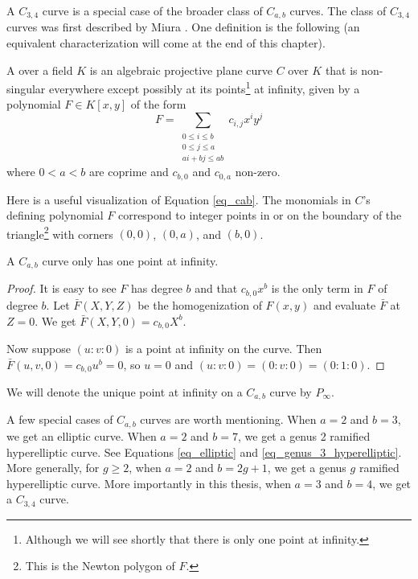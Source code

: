 A $C_{3,4}$ curve is a special case of the broader class of $C_{a,b}$ curves.
The class of $C_{3,4}$ curves was first described by Miura \cite{miura97}.
One definition is the following (an equivalent characterization will come at the end of this chapter).

\begin{definition}
  \label{def_cab_curve}
  A  over a field $K$
  is an algebraic projective plane curve $C$ over $K$
  that is non-singular everywhere except possibly at its points\footnote{
Although we will see shortly that there is only one point at infinity.}
  at infinity, given by a polynomial $F \in K[x,y]$ of the form
  \begin{equation}
    \label{eq_cab}
    F = \sum_{\substack{0 \leq i \leq b \\ 0 \leq j \leq a \\ ai + bj \leq ab }}c_{i,j}x^iy^j
  \end{equation}
  where $0 < a < b$ are coprime and $c_{b,0}$ and $c_{0,a}$ non-zero.
\end{definition}
Here is a useful visualization of Equation \ref{eq_cab}.
The monomials in $C$'s defining polynomial $F$ correspond to integer points
in or on the boundary of the triangle\footnote{
This is the Newton polygon of $F$.}
with corners $(0, 0)$, $(0, a)$, and $(b, 0)$.

\begin{proposition}
  A $C_{a,b}$ curve only has one point at infinity.
\end{proposition}
\begin{proof}
  It is easy to see $F$ has degree $b$
  and that $c_{b,0}x^b$ is the only term in $F$ of degree $b$.
  Let $\bar F(X,Y,Z)$ be the homogenization of $F(x,y)$ and evaluate $\bar F$ at $Z = 0$.
  We get $\bar F(X,Y,0) = c_{b,0}X^b$.
  
  Now suppose $(u:v:0)$ is a point at infinity on the curve.
  Then $\bar F(u,v,0) = c_{b,0}u^b = 0$, so $u = 0$ and $(u : v : 0) = (0 : v : 0) = (0 : 1 : 0)$.
\end{proof}
We will denote the unique point at infinity on a $C_{a,b}$ curve by $P_{\infty}$.

A few special cases of $C_{a,b}$ curves are worth mentioning.
When $a = 2$ and $b = 3$, we get an elliptic curve.
When $a = 2$ and $b = 7$, we get a genus 2 ramified hyperelliptic curve.
See Equations \ref{eq_elliptic} and \ref{eq_genus_3_hyperelliptic}.
More generally, for $g \geq 2$, when $a = 2$ and $b = 2g + 1$, we get a genus $g$ ramified hyperelliptic curve.
More importantly in this thesis,
when $a = 3$ and $b = 4$, we get a $C_{3,4}$ curve.

